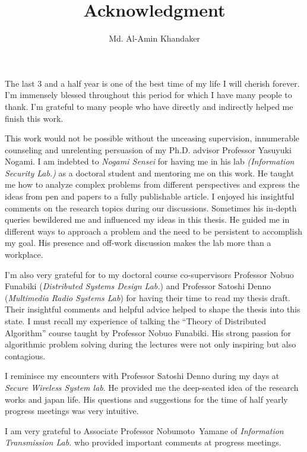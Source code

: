 \documentclass[a4paper]{article}
\title{Acknowledgment}
\author{Md. Al-Amin Khandaker}
\begin{document}
\maketitle


The last 3 and a half year is one of the best time of my life I will cherish forever. 
I'm immensely blessed throughout this period for which I have many people to thank.
I'm grateful to many people who have directly and indirectly helped me finish this work.

\vspace{5pt}
This work would not be possible without the unceasing supervision, innumerable counseling and unrelenting persuasion of my Ph.D. advisor Professor Yasuyuki Nogami.
I am indebted to \textit{Nogami Sensei} for having me in his lab \textit{(Information Security Lab.)} as a doctoral student and mentoring me on this work.
He taught me how to analyze complex problems from different perspectives and express the ideas from pen and papers to a fully publishable article.
I enjoyed his insightful comments on the research topics during our discussions.
Sometimes his in-depth queries bewildered me and influenced my ideas in this thesis.
He guided me in different ways to approach a problem and the need to be persistent to accomplish my goal.
His presence and off-work discussion makes the lab more than a workplace. 

\vspace{5pt}
I’m also very grateful for to my doctoral course co-supervisors Professor Nobuo Funabiki (\textit{Distributed Systems Design Lab.}) and Professor Satoshi Denno (\textit{Multimedia Radio Systems Lab}) for having their time to read my thesis draft.
Their insightful comments and helpful advice helped to shape the thesis into this state.
I must recall my experience of talking the “Theory of Distributed Algorithm” course taught by Professor Nobuo Funabiki.
His strong passion for algorithmic problem solving during the lectures were not only inspiring but also contagious. 

\vspace{5pt}
I reminisce my encounters with Professor Satoshi Denno during my days at \textit{Secure Wireless System lab}.
He provided me the  deep-seated idea of the research works and japan life.
His questions and suggestions for the time of half yearly progress meetings was very intuitive. 

\vspace{5pt}
I am very grateful to Associate Professor \mbox{Nobumoto Yamane} of \textit{Information Transmission Lab.} who provided  important comments at progress meetings.
\end{document}
